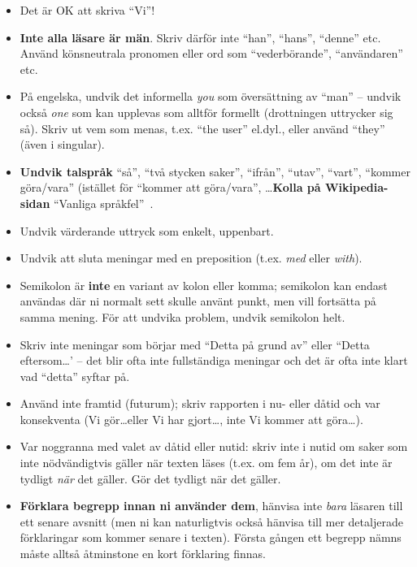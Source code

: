 \begin{itemize}
\item    Det är OK att skriva ``Vi''!

\item    \textbf{Inte alla läsare är män}.  Skriv därför inte ``han'', ``hans'', ``denne'' etc.  Använd könsneutrala pronomen eller ord som ``vederbörande'', ``användaren'' etc. 

\item På engelska, undvik det informella \emph{you} som översättning av ``man'' -- undvik också \emph{one} som kan upplevas som alltför formellt (drottningen uttrycker sig så). Skriv ut vem som menas, t.ex. ``the user'' el.dyl., eller använd ``they'' (även i singular).

\item    \textbf{Undvik talspråk} ``så'', ``två stycken saker'', ``ifrån'', ``utav'', ``vart'', ``kommer göra/vara'' (istället för ``kommer att göra/vara'', \ldots \textbf{Kolla på Wikipedia-sidan} ``Vanliga språkfel''~\cite{wp:sprakfel}.

\item    Undvik värderande uttryck som enkelt, uppenbart.

\item Undvik att sluta meningar med en preposition (t.ex. \emph{med} eller \emph{with}).

\item    Semikolon är \textbf{inte} en variant av kolon eller komma; semikolon kan endast an\-vän\-das där ni normalt sett skulle använt punkt, men vill fortsätta på samma mening. För att undvika problem, undvik semikolon helt.

\item    Skriv inte meningar som börjar med ``Detta på grund av'' eller ``Detta eftersom\ldots' -- det blir ofta inte fullständiga meningar och det är ofta inte klart vad ``detta'' syftar på.

\item    Använd inte framtid (futurum); skriv rapporten i nu- eller dåtid och var konsekventa (Vi gör\ldots eller Vi har gjort\ldots, inte Vi kommer att göra\ldots). 

\item Var noggranna med valet av dåtid eller nutid: skriv inte i nutid om saker som inte nödvändigtvis gäller när texten läses (t.ex. om fem år), om det inte är tydligt \emph{när} det gäller. Gör det tydligt när det gäller.

\label{app:definiera-innan-anv}
\item    \textbf{Förklara begrepp innan ni använder dem}, hänvisa inte \emph{bara} läsaren till ett senare avsnitt (men ni kan naturligtvis också hänvisa till mer detaljerade förklaringar som kommer senare i texten).  Första gången ett begrepp nämns måste alltså åt\-min\-sto\-ne en kort förklaring finnas.


\end{itemize}

